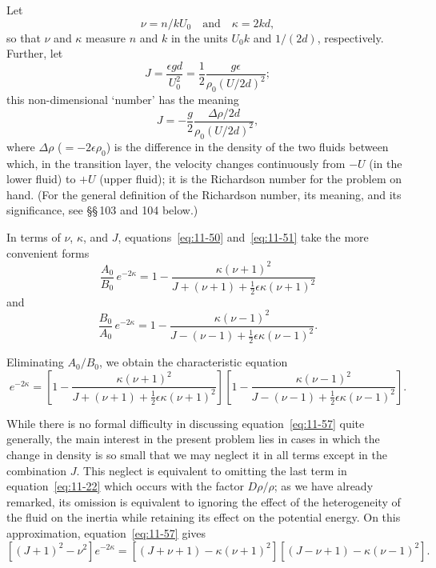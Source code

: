 Let
\begin{equation}
\label{eq:11-52}
\nu = n/kU_0 \quad\text{and}\quad \kappa = 2kd,
\end{equation}
so that $\nu$ and $\kappa$ measure $n$ and $k$ in the units $U_0 k$ and $1/(2d)$, respectively. Further, let
\begin{equation}
\label{eq:11-53}
J = \frac{\epsilon g d}{U_0^2} = \frac{1}{2}\frac{g\epsilon}{\rho_0 (U/2d)^2};
\end{equation}
this non-dimensional `number' has the meaning
\begin{equation}
\label{eq:11-54}
J = -\frac{g}{2}\frac{\Delta\rho/2d}{\rho_0(U/2d)^2},
\end{equation}
where $\Delta\rho$ ($= -2\epsilon\rho_0$) is the difference in the density of the two fluids between which, in the transition layer, the velocity changes continuously from $-U$ (in the lower fluid) to $+U$ (upper fluid); it is the Richardson number for the problem on hand. (For the general definition of the Richardson number, its meaning, and its significance, see \S\S\,103 and 104 below.)

In terms of $\nu$, $\kappa$, and $J$, equations~\eqref{eq:11-50} and~\eqref{eq:11-51} take the more convenient forms
\begin{equation}
\label{eq:11-55}
\frac{A_0}{B_0}\,e^{-2\kappa} = 1 - \frac{\kappa(\nu+1)^2}{J+(\nu+1)+\frac{1}{2}\epsilon\kappa(\nu+1)^2}
\end{equation}
and
\begin{equation}
\label{eq:11-56}
\frac{B_0}{A_0}\,e^{-2\kappa} = 1 - \frac{\kappa(\nu-1)^2}{J-(\nu-1)+\frac{1}{2}\epsilon\kappa(\nu-1)^2}.
\end{equation}

Eliminating $A_0/B_0$, we obtain the characteristic equation
\begin{equation}
\label{eq:11-57}
e^{-2\kappa} = \left[1-\frac{\kappa(\nu+1)^2}{J+(\nu+1)+\frac{1}{2}\epsilon\kappa(\nu+1)^2}\right]\!\left[1-\frac{\kappa(\nu-1)^2}{J-(\nu-1)+\frac{1}{2}\epsilon\kappa(\nu-1)^2}\right]\!.
\end{equation}

While there is no formal difficulty in discussing equation~\eqref{eq:11-57} quite generally, the main interest in the present problem lies in cases in which the change in density is so small that we may neglect it in all terms except in the combination $J$. This neglect is equivalent to omitting the last term in equation~\eqref{eq:11-22} which occurs with the factor $D\rho/\rho$; as we have already remarked, its omission is equivalent to ignoring the effect of the heterogeneity of the fluid on the inertia while retaining its effect on the potential energy. On this approximation, equation~\eqref{eq:11-57} gives
\begin{equation}
\label{eq:11-58}
\left[(J+1)^2-\nu^2\right]e^{-2\kappa} = \left[(J+\nu+1)-\kappa(\nu+1)^2\right]\!\left[(J-\nu+1)-\kappa(\nu-1)^2\right]\!.
\end{equation}

